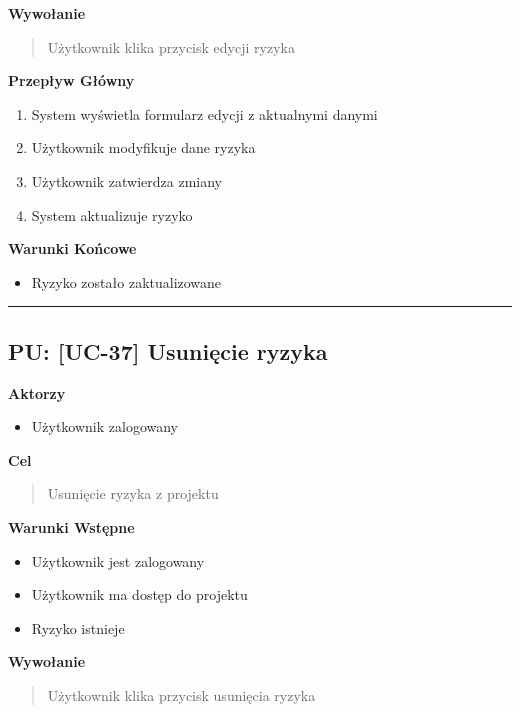 \vspace{0.2cm}
\noindent\textbf{Wywołanie}
\begin{quote}
    Użytkownik klika przycisk edycji ryzyka
\end{quote}

\vspace{0.2cm}
\noindent\textbf{Przepływ Główny}
\begin{enumerate}
    \item System wyświetla formularz edycji z aktualnymi danymi
    \item Użytkownik modyfikuje dane ryzyka
    \item Użytkownik zatwierdza zmiany
    \item System aktualizuje ryzyko
\end{enumerate}

\vspace{0.2cm}
\noindent\textbf{Warunki Końcowe}
\begin{itemize}
    \item Ryzyko zostało zaktualizowane
\end{itemize}


\hrule
\vspace{1cm}

\subsection*{PU: [UC-37] Usunięcie ryzyka}

\noindent\textbf{Aktorzy}
\begin{itemize}
    \item Użytkownik zalogowany
\end{itemize}

\vspace{0.2cm}
\noindent\textbf{Cel}
\begin{quote}
    Usunięcie ryzyka z projektu
\end{quote}

\vspace{0.2cm}
\noindent\textbf{Warunki Wstępne}
\begin{itemize}
    \item Użytkownik jest zalogowany
    \item Użytkownik ma dostęp do projektu
    \item Ryzyko istnieje
\end{itemize}

\vspace{0.2cm}
\noindent\textbf{Wywołanie}
\begin{quote}
    Użytkownik klika przycisk usunięcia ryzyka
\end{quote}

